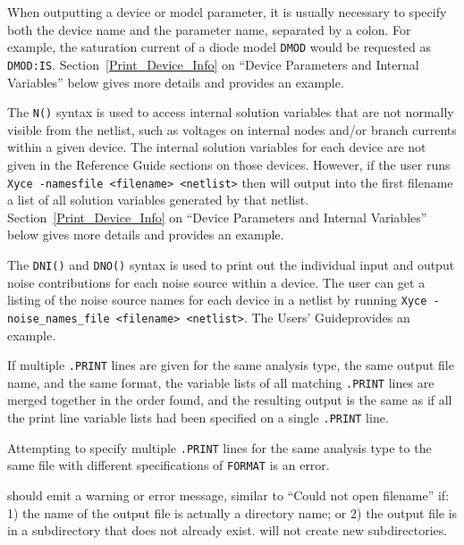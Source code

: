 \begin{Command}
\begin{XyceItemize}
\item When outputting a device or model parameter, it is usually
  necessary to specify both the device name and the parameter name,
  separated by a colon.  For example, the saturation current of a
  diode model \texttt{DMOD} would be requested
  as \texttt{DMOD:IS}. Section~\ref{Print_Device_Info} on ``Device
  Parameters and Internal Variables'' below gives more details and
  provides an example.

\item The \texttt{N()} syntax is used to access internal solution variables 
that are not normally visible from the netlist, such as voltages on
internal nodes and/or branch currents within a given device.  The
internal solution variables for each \Xyce{} device are not given in
the Reference Guide sections on those devices.  However, if the user
runs \texttt{Xyce -namesfile <filename> <netlist>} then \Xyce{} will
output into the first filename a list of all solution variables
generated by that netlist.  Section~\ref{Print_Device_Info} on
``Device Parameters and Internal Variables'' below gives more details
and provides an example.

\item The \texttt{DNI()} and \texttt{DNO()} syntax is used to print out the
  individual input and output noise contributions for each noise source within
  a device. The user can get a listing of the noise source names for each device in
  a netlist by running \texttt{Xyce -noise\_names\_file <filename> <netlist>}.
  The \Xyce{} Users' Guide\UsersGuide provides an example.

\item If multiple \texttt{.PRINT} lines are given for the same analysis type,
  the same output file name, and the same format, the variable lists
  of all matching \texttt{.PRINT} lines are merged together in the order
  found, and the resulting output is the same as if all the print line
  variable lists had been specified on a single \texttt{.PRINT} line.

\item Attempting to specify multiple \texttt{.PRINT} lines for the same
  analysis type to the same file with different specifications
  of \texttt{FORMAT} is an error.

\item \Xyce{} should emit a warning or error message, similar to 
  ``Could not open filename'' if: 1) the name of the output file is 
  actually a directory name; or 2) the output file is in a 
  subdirectory that does not already exist.  \Xyce{} 
  will not create new subdirectories.


\end{XyceItemize}
\end{Command}
